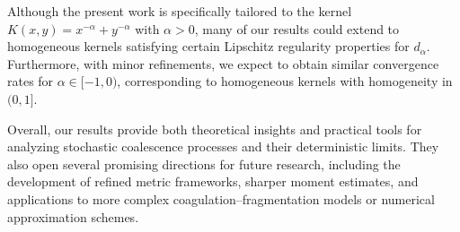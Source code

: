 \documentclass[11pt,a4paper]{article}
\newcommand{\RR}{\mathbb{R}}
\newcommand{\red}[1]{\textcolor{red}{#1}}
\newtheorem{lemma}[theorem]{Lemma}
\begin{document}
Although the present work is specifically tailored to the kernel $K(x,y) = x^{-\alpha} + y^{-\alpha}$ with $\alpha > 0$, many of our results could extend to homogeneous kernels satisfying certain Lipschitz regularity properties for $d_\alpha$. Furthermore, with minor refinements, we expect to obtain similar convergence rates for $\alpha \in [-1,0)$, corresponding to homogeneous kernels with homogeneity in $(0,1]$.

Overall, our results provide both theoretical insights and practical tools for analyzing stochastic coalescence processes and their deterministic limits. They also open several promising directions for future research, including the development of refined metric frameworks, sharper moment estimates, and applications to more complex coagulation–fragmentation models or numerical approximation schemes.

\appendix

    
\end{document}
